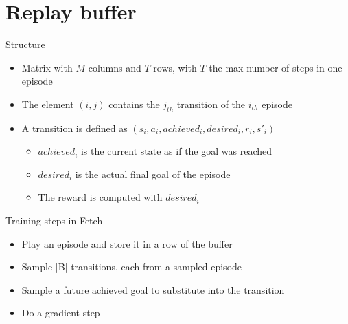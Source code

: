 \documentclass{beamer}
\begin{document}
\section{Replay buffer}

      \begin{frame}{Structure}
            \begin{itemize}
                  \item Matrix with $M$ columns and $T$ rows, with $T$ the max number of steps in one episode
                  \item The element $(i,j)$ contains the $j_{th}$ transition of the $i_{th}$ episode
                  \item A transition is defined as $(s_i,a_i,achieved_i,desired_i,r_i,s'_i)$
                  \begin{itemize}
                        \item $achieved_i$ is the current state as if the goal was reached
                        \item $desired_i$ is the actual final goal of the episode
                        \item The reward is computed with $desired_i$
                  \end{itemize}
            \end{itemize}
            \begin{block}{Training steps in Fetch}
                  \begin{itemize}
                        \item Play an episode and store it in a row of the buffer
                        \item Sample |B| transitions, each from a sampled episode
                        \item Sample a future achieved goal to substitute into the transition
                        \item Do a gradient step
                  \end{itemize}
            \end{block}

            
      \end{frame}
\end{document}
